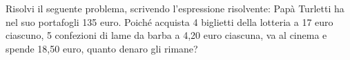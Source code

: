 \item Risolvi il seguente problema, scrivendo l'espressione risolvente: Papà Turletti ha nel suo portafogli 135 euro. Poiché acquista 4 biglietti della lotteria a 17 euro ciascuno, 5 confezioni di lame da barba a 4,20 euro ciascuna, va al cinema e spende 18,50 euro, quanto denaro gli rimane?